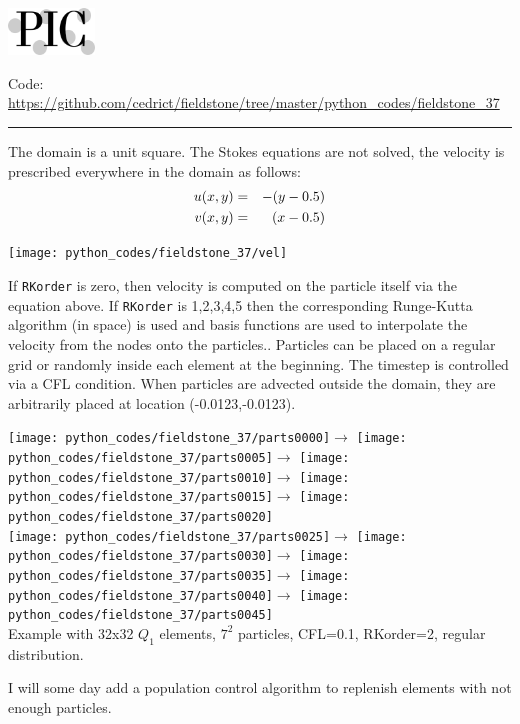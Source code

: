 \includegraphics[height=1.25cm]{images/pictograms/pic}




\begin{center}
\inpython
{\small Code: \url{https://github.com/cedrict/fieldstone/tree/master/python_codes/fieldstone_37}}
\end{center}

\par\noindent\rule{\textwidth}{0.4pt}


The domain is a unit square. The Stokes equations are not solved, the velocity is prescribed 
everywhere in the domain as follows:
\begin{eqnarray}
u(x,y)&=&-(y-0.5)\nonumber\\
v(x,y)&=&(x-0.5) \nonumber
\end{eqnarray}

\begin{center}
\texttt{[image: python\_codes/fieldstone\_37/vel]}
\end{center}

If {\tt RKorder} is zero, then velocity is computed on the particle itself via the equation above. 
If {\tt RKorder} is 1,2,3,4,5 then the corresponding Runge-Kutta algorithm (in space) is used and basis functions are
used to interpolate the velocity from the nodes onto the particles.. 
Particles can be placed on a regular grid or randomly inside each element at the beginning.
The timestep is controlled via a CFL condition.    
When particles are advected outside the domain, they are arbitrarily placed at location (-0.0123,-0.0123).

\begin{center}
\texttt{[image: python\_codes/fieldstone\_37/parts0000]}$\rightarrow$
\texttt{[image: python\_codes/fieldstone\_37/parts0005]}$\rightarrow$
\texttt{[image: python\_codes/fieldstone\_37/parts0010]}$\rightarrow$
\texttt{[image: python\_codes/fieldstone\_37/parts0015]}$\rightarrow$
\texttt{[image: python\_codes/fieldstone\_37/parts0020]}\\
\texttt{[image: python\_codes/fieldstone\_37/parts0025]}$\rightarrow$
\texttt{[image: python\_codes/fieldstone\_37/parts0030]}$\rightarrow$
\texttt{[image: python\_codes/fieldstone\_37/parts0035]}$\rightarrow$
\texttt{[image: python\_codes/fieldstone\_37/parts0040]}$\rightarrow$
\texttt{[image: python\_codes/fieldstone\_37/parts0045]}\\
{\captionfont Example with 32x32 $Q_1$ elements, $7^2$ particles, CFL=0.1, RKorder=2, regular distribution.}
\end{center}


I will some day add a population control algorithm to replenish elements with not enough particles.

